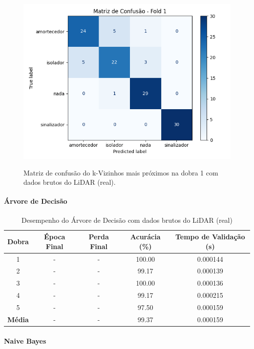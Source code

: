 \begin{figure}[H]
\caption{Matriz de confusão do k-Vizinhos mais próximos na dobra 1 com dados brutos do LiDAR (real).}
\centering
\includegraphics[width=0.7\linewidth]{figuras/Resultados/real_principal_Teste2_knn.png}
\fonte{}
\label{fig:matriz_confusao_knn_lidar_bruto_real}
\end{figure}


\paragraph{Árvore de Decisão}

\begin{table}[H]
\centering
\caption{Desempenho do Árvore de Decisão com dados brutos do LiDAR (real)}
\label{tab:arvore_lidar_bruto_real_2}
\begin{tabular}{ccccc}
\hline
\textbf{Dobra} & \textbf{Época Final} & \textbf{Perda Final} & \textbf{Acurácia (\%)} & \textbf{Tempo de Validação (s)} \\
\hline
1 & - & - & 100.00 & 0.000144 \\
2 & - & - & 99.17 & 0.000139 \\
3 & - & - & 100.00 & 0.000136 \\
4 & - & - & 99.17 & 0.000215 \\
5 & - & - & 97.50 & 0.000159 \\
\hline
\textbf{Média} & - & - & 99.37 & 0.000159 \\
\hline
\end{tabular}
\fonte{}
\end{table}

\paragraph{Naive Bayes}

